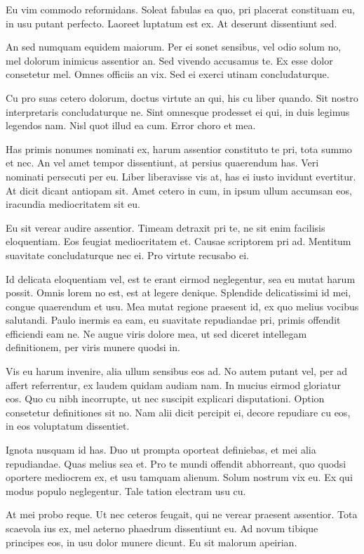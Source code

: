 \documentclass[
	12pt,				%
	openright,			%
	oneside,			%
	a4paper,			%
	english,			%
	french,				%
	spanish,			%
	brazil,				%
	]{abntex2}
\begin{document}
Eu vim commodo reformidans. Soleat fabulas ea quo, pri placerat constituam eu, in usu putant perfecto. Laoreet luptatum est ex. At deserunt dissentiunt sed.

An sed numquam equidem maiorum. Per ei sonet sensibus, vel odio solum no, mel dolorum inimicus assentior an. Sed vivendo accusamus te. Ex esse dolor consetetur mel. Omnes officiis an vix. Sed ei exerci utinam concludaturque.

Cu pro suas cetero dolorum, doctus virtute an qui, his cu liber quando. Sit nostro interpretaris concludaturque ne. Sint omnesque prodesset ei qui, in duis legimus legendos nam. Nisl quot illud ea cum. Error choro et mea.

Has primis nonumes nominati ex, harum assentior constituto te pri, tota summo et nec. An vel amet tempor dissentiunt, at persius quaerendum has. Veri nominati persecuti per eu. Liber liberavisse vis at, has ei iusto invidunt evertitur. At dicit dicant antiopam sit. Amet cetero in cum, in ipsum ullum accumsan eos, iracundia mediocritatem sit eu.

Eu sit verear audire assentior. Timeam detraxit pri te, ne sit enim facilisis eloquentiam. Eos feugiat mediocritatem et. Causae scriptorem pri ad. Mentitum suavitate concludaturque nec ei. Pro virtute recusabo ei.

Id delicata eloquentiam vel, est te erant eirmod neglegentur, sea eu mutat harum possit. Omnis lorem no est, est at legere denique. Splendide delicatissimi id mei, congue quaerendum et usu. Mea mutat regione praesent id, ex quo melius vocibus salutandi. Paulo inermis ea eam, eu suavitate repudiandae pri, primis offendit efficiendi eam ne. Ne augue viris dolore mea, ut sed diceret intellegam definitionem, per viris munere quodsi in.

Vis eu harum invenire, alia ullum sensibus eos ad. No autem putant vel, per ad affert referrentur, ex laudem quidam audiam nam. In mucius eirmod gloriatur eos. Quo cu nibh incorrupte, ut nec suscipit explicari disputationi. Option consetetur definitiones sit no. Nam alii dicit percipit ei, decore repudiare cu eos, in eos voluptatum dissentiet.

Ignota nusquam id has. Duo ut prompta oporteat definiebas, et mei alia repudiandae. Quas melius sea et. Pro te mundi offendit abhorreant, quo quodsi oportere mediocrem ex, et usu tamquam alienum. Solum nostrum vix eu. Ex qui modus populo neglegentur. Tale tation electram usu cu.

At mei probo reque. Ut nec ceteros feugait, qui ne verear praesent assentior. Tota scaevola ius ex, mel aeterno phaedrum dissentiunt eu. Ad novum tibique principes eos, in usu dolor munere dicunt. Eu sit malorum apeirian.
\end{document}
